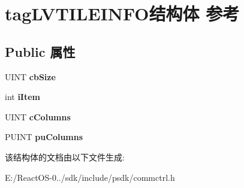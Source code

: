 \hypertarget{structtag_l_v_t_i_l_e_i_n_f_o}{}\section{tag\+L\+V\+T\+I\+L\+E\+I\+N\+F\+O结构体 参考}
\label{structtag_l_v_t_i_l_e_i_n_f_o}
\subsection*{Public 属性}
\begin{DoxyCompactItemize}
\item 
\mbox{\label{structtag_l_v_t_i_l_e_i_n_f_o_ad136e1654ef8f20dbf10f3b476ba29c8}} 
U\+I\+NT {\bfseries cb\+Size}
\item 
\mbox{\label{structtag_l_v_t_i_l_e_i_n_f_o_a62a805d022abdff1c1687d225ae03d42}} 
int {\bfseries i\+Item}
\item 
\mbox{\label{structtag_l_v_t_i_l_e_i_n_f_o_aa6c5e33932ba8135da8cdfa16871cfa2}} 
U\+I\+NT {\bfseries c\+Columns}
\item 
\mbox{\label{structtag_l_v_t_i_l_e_i_n_f_o_a4c5cc59c51ec812295f2f65e87d03c91}} 
P\+U\+I\+NT {\bfseries pu\+Columns}
\end{DoxyCompactItemize}


该结构体的文档由以下文件生成\+:\begin{DoxyCompactItemize}
\item 
E\+:/\+React\+O\+S-\/0../sdk/include/psdk/commctrl.\+h\end{DoxyCompactItemize}

